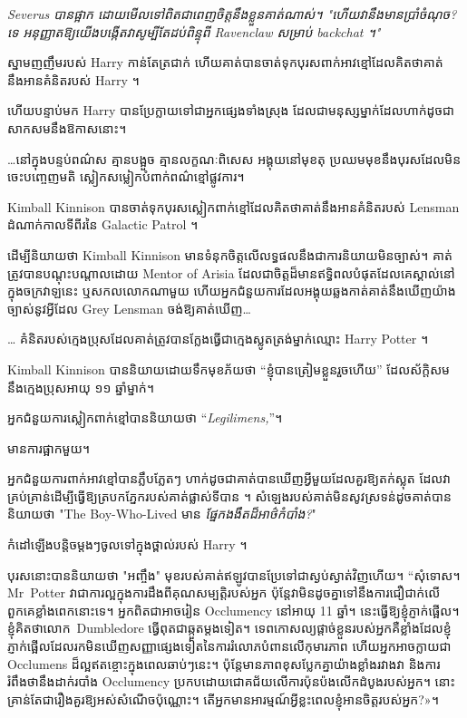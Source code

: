 {\emph{Severus បានផ្អាក ដោយមើលទៅពិតជាពេញចិត្តនឹងខ្លួនគាត់ណាស់។ "ហើយវានឹងមានប្រាំចំណុច? ទេ អនុញ្ញាតឱ្យយើងបង្កើតវាសូម្បីតែដប់ពិន្ទុពី Ravenclaw សម្រាប់ backchat ។"}

ស្នាមញញឹមរបស់ Harry កាន់តែត្រជាក់ ហើយគាត់បានចាត់ទុកបុរសពាក់អាវខ្មៅដែលគិតថាគាត់នឹងអានគំនិតរបស់ Harry ។

ហើយបន្ទាប់មក Harry បានប្រែក្លាយទៅជាអ្នកផ្សេងទាំងស្រុង ដែលជាមនុស្សម្នាក់ដែលហាក់ដូចជាសាកសមនឹងឱកាសនោះ។

…នៅក្នុងបន្ទប់ពណ៌ស គ្មានបង្អួច គ្មានលក្ខណៈពិសេស អង្គុយនៅមុខតុ ប្រឈមមុខនឹងបុរសដែលមិនចេះបញ្ចេញមតិ ស្លៀកសម្លៀកបំពាក់ពណ៌ខ្មៅផ្លូវការ។

Kimball Kinnison បានចាត់ទុកបុរសស្លៀកពាក់ខ្មៅដែលគិតថាគាត់នឹងអានគំនិតរបស់ Lensman ដំណាក់កាលទីពីរនៃ Galactic Patrol ។

ដើម្បីនិយាយថា Kimball Kinnison មានទំនុកចិត្តលើលទ្ធផលនឹងជាការនិយាយមិនច្បាស់។ គាត់ត្រូវបានបណ្តុះបណ្តាលដោយ Mentor of Arisia ដែលជាចិត្តដ៏មានឥទ្ធិពលបំផុតដែលគេស្គាល់នៅក្នុងចក្រវាឡនេះ ឬសកលលោកណាមួយ ហើយអ្នកជំនួយការដែលអង្គុយឆ្លងកាត់គាត់នឹងឃើញយ៉ាងច្បាស់នូវអ្វីដែល Grey Lensman ចង់ឱ្យគាត់ឃើញ…

… គំនិតរបស់ក្មេងប្រុសដែលគាត់ត្រូវបានក្លែងធ្វើជាក្មេងស្លូតត្រង់ម្នាក់ឈ្មោះ Harry Potter ។

Kimball Kinnison បាន​និយាយ​ដោយ​ទឹក​មុខ​ភ័យ​ថា “ខ្ញុំ​បាន​ត្រៀម​ខ្លួន​រួច​ហើយ” ដែល​ស័ក្តិសម​នឹង​ក្មេង​ប្រុស​អាយុ ១១ ឆ្នាំ​ម្នាក់។

អ្នកជំនួយការស្លៀកពាក់ខ្មៅបាននិយាយថា “\emph{Legilimens,}”។

មានការផ្អាកមួយ។

អ្នកជំនួយការពាក់អាវខ្មៅបានភ្លឹបភ្លែតៗ ហាក់ដូចជាគាត់បានឃើញអ្វីមួយដែលគួរឱ្យតក់ស្លុត ដែលវាគ្រប់គ្រាន់ដើម្បីធ្វើឱ្យត្របកភ្នែករបស់គាត់ផ្លាស់ទីបាន \emph{} ។ សំឡេងរបស់គាត់មិនសូវស្រទន់ដូចគាត់បាននិយាយថា "The Boy-Who-Lived មាន \emph{ផ្នែកងងឹតដ៏អាថ៌កំបាំង?}"

កំដៅឡើងបន្តិចម្តងៗចូលទៅក្នុងថ្ពាល់របស់ Harry ។

បុរសនោះបាននិយាយថា "អញ្ចឹង" មុខ​របស់​គាត់​ឥឡូវ​បាន​ប្រែ​ទៅ​ជា​ស្ងប់​ស្ងាត់​វិញ​ហើយ។ “សុំទោស។ Mr~Potter វាជាការល្អក្នុងការដឹងពីគុណសម្បត្តិរបស់អ្នក ប៉ុន្តែវាមិនដូចគ្នាទៅនឹងការជឿជាក់លើពួកគេខ្លាំងពេកនោះទេ។ អ្នកពិតជាអាចរៀន Occlumency នៅអាយុ 11 ឆ្នាំ។ នេះធ្វើឱ្យខ្ញុំភ្ញាក់ផ្អើល។ ខ្ញុំគិតថាលោក~Dumbledore ធ្វើពុតជាឆ្កួតម្តងទៀត។ ទេពកោសល្យផ្តាច់ខ្លួនរបស់អ្នកគឺខ្លាំងដែលខ្ញុំភ្ញាក់ផ្អើលដែលរកមិនឃើញសញ្ញាផ្សេងទៀតនៃការរំលោភបំពានលើកុមារភាព ហើយអ្នកអាចក្លាយជា Occlumens ដ៏ល្អឥតខ្ចោះក្នុងពេលឆាប់ៗនេះ។ ប៉ុន្តែមានភាពខុសប្លែកគ្នាយ៉ាងខ្លាំងរវាងវា និងការរំពឹងថានឹងដាក់របាំង Occlumency ប្រកបដោយជោគជ័យលើការប៉ុនប៉ងលើកដំបូងរបស់អ្នក។ នោះគ្រាន់តែជារឿងគួរឱ្យអស់សំណើចប៉ុណ្ណោះ។ តើ​អ្នក​មាន​អារម្មណ៍​អ្វី​ខ្លះ​ពេល​ខ្ញុំ​អាន​ចិត្ត​របស់​អ្នក?»។

}
